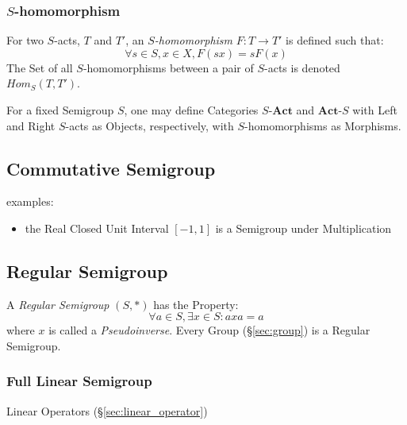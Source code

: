 \subsubsection{$S$-homomorphism}\label{sec:s_homomorphism}

For two $S$-acts, $T$ and $T'$, an \emph{$S$-homomorphism} $F : T
\rightarrow T'$ is defined such that:
\[
  \forall s \in S, x \in X, F(sx) = sF(x)
\]
The Set of all $S$-homomorphisms between a pair of $S$-acts is denoted
$Hom_S(T,T')$.

For a fixed Semigroup $S$, one may define Categories
$S\text{-}\mathbf{Act}$ and $\mathbf{Act}\text{-}S$ with Left and
Right $S$-acts as Objects, respectively, with $S$-homomorphisms as
Morphisms.



\subsection{Commutative Semigroup}\label{sec:commutative_semigroup}

examples:
\begin{itemize}
  \item the Real Closed Unit Interval $[-1,1]$ is a Semigroup under
    Multiplication
\end{itemize}



\subsection{Regular Semigroup}\label{sec:regular_semigroup}

A \emph{Regular Semigroup} $(S,*)$ has the Property:
\[
  \forall a \in S, \exists x \in S : axa = a
\]
where $x$ is called a \emph{Pseudoinverse}. Every Group
(\S\ref{sec:group}) is a Regular Semigroup.



\subsubsection{Full Linear Semigroup}\label{sec:full_linear_semigroup}

Linear Operators (\S\ref{sec:linear_operator})

